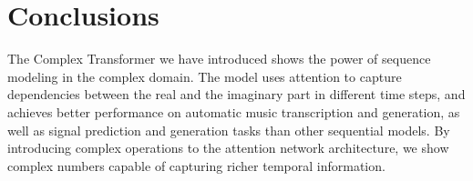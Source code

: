 \documentclass{article}
\begin{document}
\section{Conclusions}

The Complex Transformer we have introduced shows the power of sequence modeling in the complex domain. The model uses attention to capture dependencies between the real and the imaginary part in different time steps, and achieves better performance on automatic music transcription and generation, as well as signal prediction and generation tasks than other sequential models. By introducing complex operations to the attention network architecture, we show complex numbers capable of capturing richer temporal information.



\vfill\pagebreak



\end{document}
